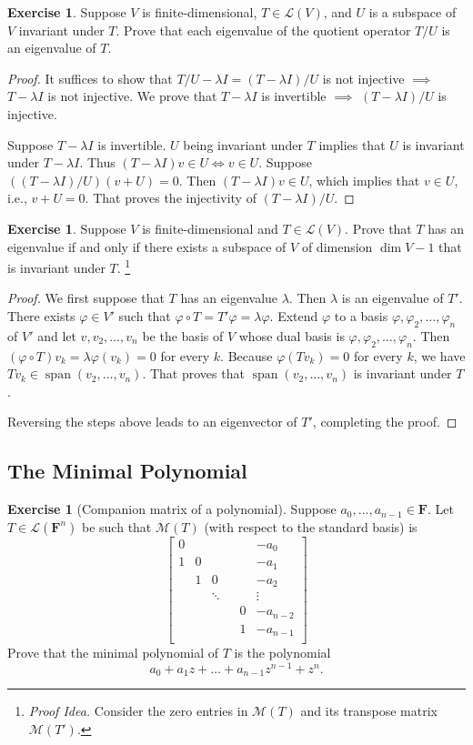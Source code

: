 \documentclass[nofonts,colorlinks]{tufte-handout}
\theoremstyle{plain} %
\theoremstyle{definition}
\newtheorem{exer}[thm]{Exercise}
\theoremstyle{remark}
\def\idea{\textit{\color[rgb]{0,0,.55}Proof Idea. }}
\renewcommand{\phi}{\varphi}
\newcommand{\F}{\mathbf{F}}
\renewcommand{\L}{\mathcal{L}}
\newcommand{\M}{\mathcal{M}}
\DeclareMathOperator{\spn}{span}
\begin{document}
\begin{exer}
	Suppose $V$ is finite-dimensional, $T\in\L(V)$, and $U$ is a subspace of $V$ invariant under $T$. Prove that each eigenvalue of the quotient operator $T/U$ is an eigenvalue of $T$.
\end{exer}
\begin{proof}
	It suffices to show that $T/U-\lambda I=(T-\lambda I)/U$ is not injective $\implies$ $T-\lambda I$ is not injective. We prove that $T-\lambda I$ is invertible $\implies$ $(T-\lambda I)/U$ is injective.

	Suppose $T-\lambda I$ is invertible. $U$ being invariant under $T$ implies that $U$ is invariant under $T-\lambda I$. Thus $(T-\lambda I)v\in U\iff v\in U$. Suppose $((T-\lambda I)/U)(v+U)=0$. Then $(T-\lambda I)v\in U$, which implies that $v\in U$, i.e., $v+U=0$. That proves the injectivity of $(T-\lambda I)/U$.
\end{proof}

\begin{exer}
	Suppose $V$ is finite-dimensional and $T\in\L(V)$. Prove that $T$ has an eigenvalue if and only if there exists a subspace of $V$ of dimension $\dim V-1$ that is invariant under $T$.%
	\footnote{\idea Consider the zero entries in $\M(T)$ and its transpose matrix $\M(T')$.}
\end{exer}
\begin{proof}
	We first suppose that $T$ has an eigenvalue $\lambda$. Then $\lambda$ is an eigenvalue of $T'$. There exists $\phi\in V'$ such that $\phi\circ T=T'\phi=\lambda\phi$. Extend $\phi$ to a basis $\phi,\phi_2,\dots,\phi_n$ of $V'$ and let $v,v_2,\dots,v_n$ be the basis of $V$ whose dual basis is $\phi,\phi_2,\dots,\phi_n$. Then $(\phi\circ T)v_k=\lambda\phi(v_k)=0$ for every $k$. Because $\phi(T v_k)=0$ for every $k$, we have $Tv_k\in\spn(v_2,\dots,v_n)$. That proves that $\spn(v_2,\dots,v_n)$ is invariant under $T$.
	
	Reversing the steps above leads to an eigenvector of $T'$, completing the proof.
\end{proof}


\subsection{The Minimal Polynomial}
\begin{exer}[Companion matrix of a polynomial]
	Suppose $a_0,\dots,a_{n-1}\in\F$. Let $T\in\L(\F^n)$ be such that $\M(T)$ (with respect to the standard basis) is
	\[\begin{bmatrix}
		0&&&&&-a_0\\
		1&0&&&&-a_1\\
		&1&0&&&-a_2\\
		&&\ddots&&&\vdots\\
		&&&&0&-a_{n-2}\\
		&&&&1&-a_{n-1}\\
	\end{bmatrix}\]
	Prove that the minimal polynomial of $T$ is the polynomial
	\[a_0+a_1z+\dots+a_{n-1}z^{n-1}+z^n.\]
\end{exer}
\end{document}
